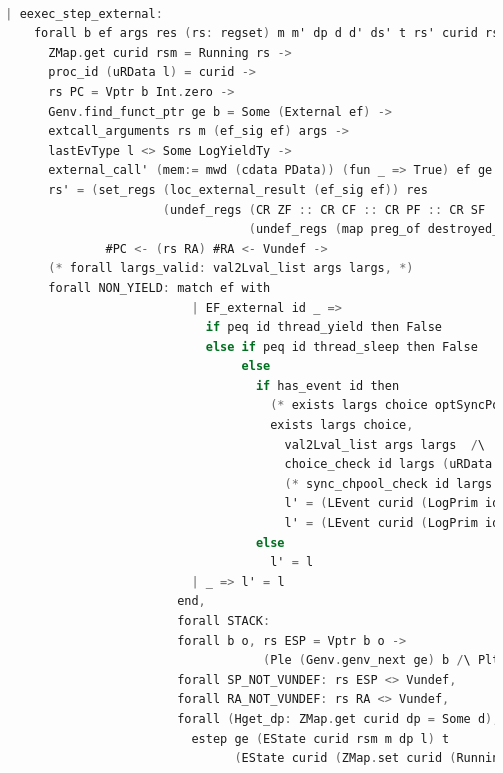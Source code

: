 \begin{lstlisting}[language=C]

  | eexec_step_external:
      forall b ef args res (rs: regset) m m' dp d d' ds' t rs' curid rsm l l',
        ZMap.get curid rsm = Running rs ->
        proc_id (uRData l) = curid ->
        rs PC = Vptr b Int.zero ->
        Genv.find_funct_ptr ge b = Some (External ef) ->
        extcall_arguments rs m (ef_sig ef) args ->
        lastEvType l <> Some LogYieldTy ->
        external_call' (mem:= mwd (cdata PData)) (fun _ => True) ef ge args (m, (uRData l, d)) t res (m', (ds',d')) ->
        rs' = (set_regs (loc_external_result (ef_sig ef)) res 
                        (undef_regs (CR ZF :: CR CF :: CR PF :: CR SF :: CR OF :: nil)
                                    (undef_regs (map preg_of destroyed_at_call) rs))) 
                #PC <- (rs RA) #RA <- Vundef ->
        (* forall largs_valid: val2Lval_list args largs, *)
        forall NON_YIELD: match ef with
                            | EF_external id _ => 
                              if peq id thread_yield then False
                              else if peq id thread_sleep then False
                                   else
                                     if has_event id then
                                       (* exists largs choice optSyncPool, *)
                                       exists largs choice,
                                         val2Lval_list args largs  /\
                                         choice_check id largs (uRData l) d = choice /\ 
                                         (* sync_chpool_check id largs (uRData l) d = optSyncPool /\  
                                         l' = (LEvent curid (LogPrim id largs choice optSyncPool) :: l) *)
                                         l' = (LEvent curid (LogPrim id largs choice (snap_func d)) :: l) 
                                     else
                                       l' = l
                            | _ => l' = l
                          end,
                          forall STACK:
                          forall b o, rs ESP = Vptr b o ->
                                      (Ple (Genv.genv_next ge) b /\ Plt b (Mem.nextblock m)),
                          forall SP_NOT_VUNDEF: rs ESP <> Vundef,
                          forall RA_NOT_VUNDEF: rs RA <> Vundef,
                          forall (Hget_dp: ZMap.get curid dp = Some d),
                            estep ge (EState curid rsm m dp l) t 
                                  (EState curid (ZMap.set curid (Running rs') rsm) m' (ZMap.set curid (Some d') dp) l')
\end{lstlisting}


